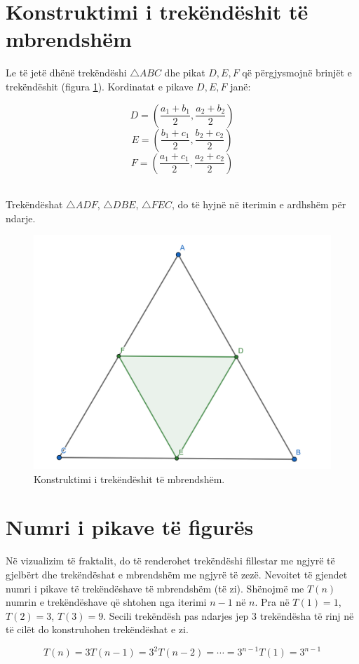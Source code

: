 \section{Konstruktimi i trekëndëshit të mbrendshëm}

Le të jetë dhënë trekëndëshi \( \triangle ABC \) dhe pikat \( D, E, F \) që përgjysmojnë brinjët e trekëndëshit (figura \ref{fig:triangle_construction}). Kordinatat e pikave \( D, E, F \) janë:


\[ D = \left( \frac{a_1 + b_1}{2}, \frac{a_2 + b_2}{2} \right) \]
\[ E = \left( \frac{b_1 + c_1}{2}, \frac{b_2 + c_2}{2} \right) \]
\[ F = \left( \frac{a_1 + c_1}{2}, \frac{a_2 + c_2}{2} \right) \]

\noindent \\ Trekëndëshat \( \triangle ADF \), \( \triangle DBE \), \( \triangle FEC \), do të hyjnë në iterimin e ardhshëm për ndarje.

\begin{figure}
    \centering
    \includegraphics[width=0.55\linewidth]{triangle_5.png}
    \caption{Konstruktimi i trekëndëshit të mbrendshëm.}
    \label{fig:triangle_construction}
\end{figure}

\section{Numri i pikave të figurës}

Në vizualizim të fraktalit, do të renderohet trekëndëshi fillestar me ngjyrë të gjelbërt dhe trekëndëshat e mbrendshëm me ngjyrë të zezë. Nevoitet të gjendet numri i pikave të trekëndëshave të mbrendshëm (të zi). Shënojmë me \( T(n) \) numrin e trekëndëshave që shtohen nga iterimi \( n-1 \) në \( n \). Pra në \( T(1) = 1 \), \( T(2) = 3 \), \( T(3) = 9 \). Secili trekëndësh pas ndarjes jep 3 trekëndësha të rinj në të cilët do konstruhohen trekëndëshat e zi.

\[ 
T(n) = 3T(n-1) = 3^2 T(n-2) = \cdots = 3^{n-1} T(1) = 3^{n-1} 
\]

